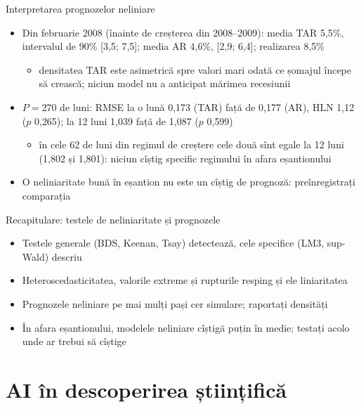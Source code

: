 \begin{frame}{Interpretarea prognozelor neliniare}
\itemsize{\small}
\begin{itemize}
    \item Din februarie 2008 (înainte de creșterea din 2008--2009): media TAR 5{,}5\%, intervalul de 90\% [3{,}5; 7{,}5]; media AR 4{,}6\%, [2{,}9; 6{,}4]; realizarea 8{,}5\%
    \begin{itemize}
        \item densitatea TAR este asimetrică spre valori mari odată ce șomajul începe să crească; niciun model nu a anticipat mărimea recesiunii
    \end{itemize}
    \item $P = 270$ de luni: RMSE la o lună 0{,}173 (TAR) față de 0{,}177 (AR), HLN 1{,}12 ($p$ 0{,}265); la 12 luni 1{,}039 față de 1{,}087 ($p$ 0{,}599)
    \begin{itemize}
        \item în cele 62 de luni din regimul de creștere cele două sînt egale la 12 luni (1{,}802 și 1{,}801): niciun cîștig specific regimului în afara eșantionului
    \end{itemize}
    \item O neliniaritate bună în eșantion nu este un cîștig de prognoză: preînregistrați comparația
\end{itemize}
\end{frame}

\begin{frame}{Recapitulare: testele de neliniaritate și prognozele}
\itemsize{\small}
\begin{itemize}
    \item Testele generale (BDS, Keenan, Tsay) detectează, cele specifice (LM3, sup-Wald) descriu
    \item Heteroscedasticitatea, valorile extreme și rupturile resping și ele liniaritatea
    \item Prognozele neliniare pe mai mulți pași cer simulare; raportați densități
    \item În afara eșantionului, modelele neliniare cîștigă puțin în medie; testați acolo unde ar trebui să cîștige
\end{itemize}
\end{frame}


\section{AI în descoperirea științifică}

